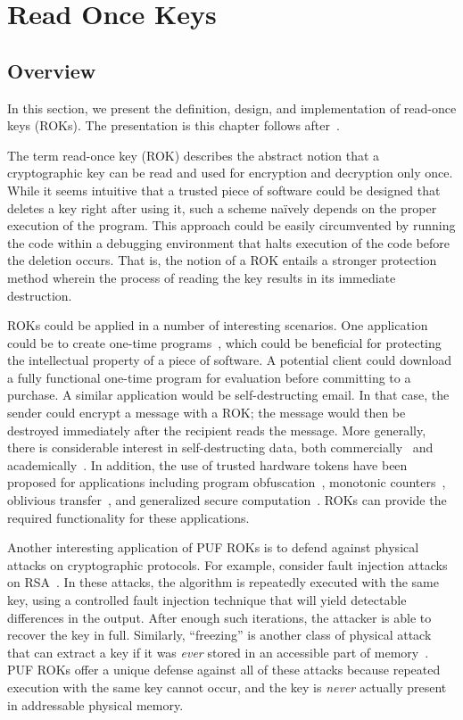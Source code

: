 
\chapter{Read Once Keys}
\label{chapter:rok}

\section{Overview}
In this section, we present the definition, design, and implementation of read-once keys (ROKs). The presentation is this chapter
follows after~\cite{PUFROK}.

The term read-once key (ROK) describes the abstract notion that a cryptographic key can be read and used for encryption
and decryption only once. While it seems intuitive that a trusted piece of software could be designed that deletes a key right after
using it, such a scheme na\"{i}vely depends on the proper execution of the program. This approach could be easily
circumvented by running the code within a debugging environment that halts execution of the code before the deletion occurs.
That is, the notion of a ROK entails a stronger protection method wherein the process of reading the key 
results in its immediate destruction.

ROKs could be applied in a number of interesting scenarios. One application could be to create one-time programs~\cite{otp},
which could be beneficial for protecting the intellectual property of a piece of software. A potential client
could download a fully functional one-time program for evaluation before committing to a purchase.  A similar application
would be self-destructing email.  In that case, the sender could encrypt a message with a ROK; the message would then
be destroyed immediately after the recipient reads the message.  More generally, there is considerable interest in self-destructing
data, both commercially~\cite{ironkey} and academically~\cite{vanish}.  In addition, the use of trusted hardware tokens have been
proposed for applications including program obfuscation~\cite{obfusc}, monotonic counters~\cite{monotonictpm}, oblivious
transfer~\cite{ottamper}, and generalized secure computation~\cite{tamperhw}.  ROKs can provide the required functionality
for these applications.

Another interesting application of PUF ROKs is to defend against physical attacks on cryptographic protocols.  For example,
consider fault injection attacks on RSA~\cite{rsapub,pertrsa,insecrsa,rsaltr,fault}.  In these attacks, the algorithm is repeatedly executed
with the same key, using a controlled fault injection technique that will yield detectable differences in the output.  After enough such
iterations, the attacker is able to recover the key in full.  Similarly, ``freezing'' is another class of physical attack
that can extract a key if it was \emph{ever} stored in an accessible part of memory~\cite{freezing}.  PUF ROKs offer a unique defense against
all of these attacks because repeated execution with the same key cannot occur, and the key is \emph{never} actually present
in addressable physical memory.

